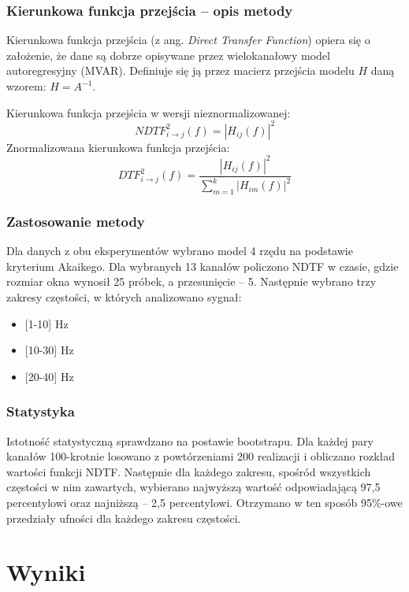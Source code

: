 \documentclass{pracamgr_2}
\begin{document}
	\subsection{Kierunkowa funkcja przejścia -- opis metody}
	Kierunkowa funkcja przejścia (z ang. \textit{Direct Transfer Function}) opiera się o założenie, że dane są dobrze opisywane przez wielokanałowy model autoregresyjny (MVAR). Definiuje się ją przez macierz przejścia modelu $H$ daną wzorem: $H = A^{-1}$.
	
	Kierunkowa funkcja przejścia w wersji nieznormalizowanej:
	\begin{equation}
		{NDTF}_{i\to j}^2 (f) = {\left|H_{ij}(f) \right|}^2
	\end{equation}
	Znormalizowana kierunkowa funkcja przejścia:
	\begin{equation}
		{DTF}_{i\to j}^2 (f) = \frac{{\left|H_{ij}(f) \right|}^2}{\sum_{m=1}^{k}{\left|H_{im}(f) \right|}^2 }
	\end{equation}
	\subsection{Zastosowanie metody}
	Dla danych z obu eksperymentów wybrano model 4 rzędu na podstawie kryterium Akaikego. Dla wybranych 13 kanałów policzono NDTF w czasie, gdzie rozmiar okna wynosił 25 próbek, a przesunięcie -- 5. Następnie wybrano trzy zakresy częstości, w których analizowano sygnał: 
	\begin{itemize}
		\item {[1-10]} Hz
		\item {[10-30]} Hz
		\item {[20-40]} Hz
	\end{itemize}
	\subsection{Statystyka}\label{NDTF}
	Istotność statystyczną sprawdzano na postawie bootstrapu. Dla każdej pary kanałów 100-krotnie losowano z powtórzeniami 200 realizacji i obliczano rozkład wartości funkcji NDTF. Następnie dla każdego zakresu, spośród wszystkich częstości w nim zawartych, wybierano najwyższą wartość odpowiadającą 97,5 percentylowi oraz najniższą -- 2,5 percentylowi. Otrzymano w ten sposób 95\%-owe przedziały ufności dla każdego zakresu częstości.
	\chapter{Wyniki}
\end{document}
